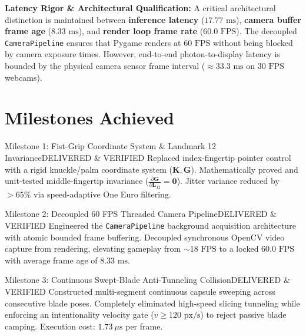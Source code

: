 \documentclass[11pt,a4paper]{article}
\begin{document}
\textbf{Latency Rigor \& Architectural Qualification:}
A critical architectural distinction is maintained between \textbf{inference latency} ($17.77\text{ ms}$), \textbf{camera buffer frame age} ($8.33\text{ ms}$), and \textbf{render loop frame rate} ($60.0\text{ FPS}$). The decoupled \texttt{CameraPipeline} ensures that Pygame renders at $60\text{ FPS}$ without being blocked by camera exposure times. However, end-to-end photon-to-display latency is bounded by the physical camera sensor frame interval ($\approx 33.3\text{ ms}$ on $30\text{ FPS}$ webcams).

\section{Milestones Achieved}

\begin{MilestoneCard}{Milestone 1: Fist-Grip Coordinate System \& Landmark 12 Invariance}{DELIVERED \& VERIFIED}{}
Replaced index-fingertip pointer control with a rigid knuckle/palm coordinate system ($\mathbf{K}, \mathbf{G}$). Mathematically proved and unit-tested middle-fingertip invariance ($\frac{\partial \mathbf{G}}{\partial \mathbf{L}_{12}} = \mathbf{0}$). Jitter variance reduced by $>65\%$ via speed-adaptive One Euro filtering.
\end{MilestoneCard}

\vspace{0.3em}

\begin{MilestoneCard}{Milestone 2: Decoupled 60 FPS Threaded Camera Pipeline}{DELIVERED \& VERIFIED}{}
Engineered the \texttt{CameraPipeline} background acquisition architecture with atomic bounded frame buffering. Decoupled synchronous OpenCV video capture from rendering, elevating gameplay from $\sim 18\text{ FPS}$ to a locked $60.0\text{ FPS}$ with average frame age of $8.33\text{ ms}$.
\end{MilestoneCard}

\vspace{0.3em}

\begin{MilestoneCard}{Milestone 3: Continuous Swept-Blade Anti-Tunneling Collision}{DELIVERED \& VERIFIED}{}
Constructed multi-segment continuous capsule sweeping across consecutive blade poses. Completely eliminated high-speed slicing tunneling while enforcing an intentionality velocity gate ($v \ge 120\text{ px/s}$) to reject passive blade camping. Execution cost: $1.73\ \mu\text{s}$ per frame.
\end{MilestoneCard}
\end{document}
